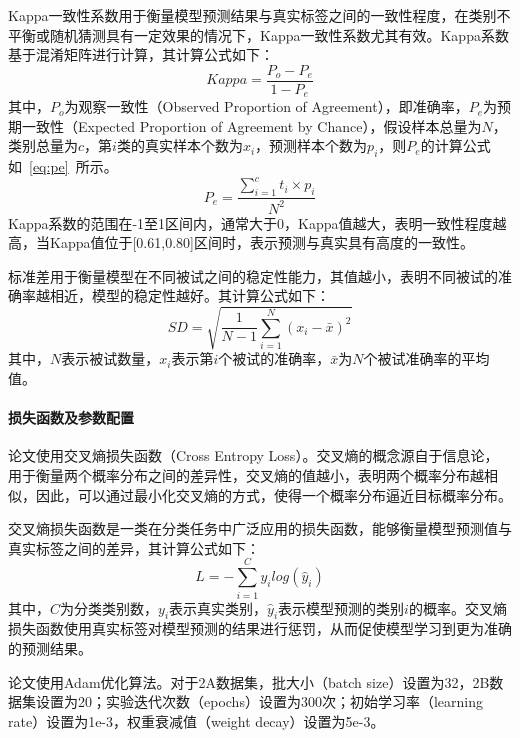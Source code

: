 Kappa一致性系数用于衡量模型预测结果与真实标签之间的一致性程度，在类别不平衡或随机猜测具有一定效果的情况下，Kappa一致性系数尤其有效。Kappa系数基于混淆矩阵进行计算，其计算公式如下：
\begin{equation}\label{eq:kappa}
    Kappa=\frac{P_o-P_e}{1-P_e}
\end{equation}
其中，\(P_o\)为观察一致性（Observed Proportion of Agreement），即准确率，\(P_e\)为预期一致性（Expected Proportion of Agreement by Chance），假设样本总量为\(N\)，类别总量为\(c\)，第\(i\)类的真实样本个数为\(x_i\)，预测样本个数为\(p_i\)，则\(P_e\)的计算公式如~\ref{eq:pe}~所示。
\begin{equation}\label{eq:pe}
    P_e=\frac{\sum_{i=1}^{c}t_i \times p_i }{N^{2} } 
\end{equation}
Kappa系数的范围在-1至1区间内，通常大于0，Kappa值越大，表明一致性程度越高，当Kappa值位于[0.61,0.80]区间时，表示预测与真实具有高度的一致性。

标准差用于衡量模型在不同被试之间的稳定性能力，其值越小，表明不同被试的准确率越相近，模型的稳定性越好。其计算公式如下：
\begin{equation}
    SD=\sqrt{\frac{1}{N-1}  \sum_{i=1}^{N}(x_i-\bar{x} )^{2} } 
    \label{eq:sd}
\end{equation}
其中，\(N\)表示被试数量，\(x_i\)表示第\(i\)个被试的准确率，\(\bar{x}\)为\(N\)个被试准确率的平均值。

\paragraph{损失函数及参数配置}

论文使用交叉熵损失函数（Cross Entropy Loss）。交叉熵的概念源自于信息论，用于衡量两个概率分布之间的差异性，交叉熵的值越小，表明两个概率分布越相似，因此，可以通过最小化交叉熵的方式，使得一个概率分布逼近目标概率分布。

交叉熵损失函数是一类在分类任务中广泛应用的损失函数，能够衡量模型预测值与真实标签之间的差异，其计算公式如下：
\begin{equation}
    L= -\sum_{i=1}^{C}y_i log(\hat{y}_i )
    \label{eq:loss}
\end{equation}
其中，\(C\)为分类类别数，\(y_i\)表示真实类别，\(\hat{y}_i\)表示模型预测的类别\(i\)的概率。交叉熵损失函数使用真实标签对模型预测的结果进行惩罚，从而促使模型学习到更为准确的预测结果。

论文使用Adam优化算法。对于2A数据集，批大小（batch size）设置为32，2B数据集设置为20；实验迭代次数（epochs）设置为300次；初始学习率（learning rate）设置为1e-3，权重衰减值（weight decay）设置为5e-3。

